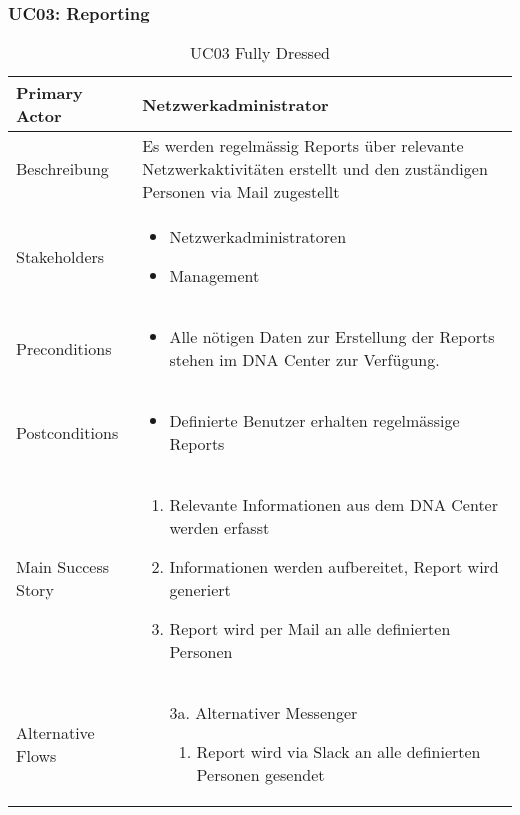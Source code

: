 \subsubsection{UC03: Reporting}
\begin{table}[H]
	\centering
	\begin{tabularx}{\textwidth}{l | X}
		Primary Actor   & Netzwerkadministrator        \\
		\hline
		Beschreibung   & Es werden regelmässig Reports über relevante Netzwerkaktivitäten erstellt und den zuständigen Personen via Mail zugestellt  \\ 
		\hline
		Stakeholders       & 
		\begin{itemize}
			\item Netzwerkadministratoren
			\item Management
		\end{itemize} \\ 
		Preconditions      &
		\begin{itemize}	
			\item Alle nötigen Daten zur Erstellung der Reports stehen im DNA Center zur Verfügung.
		\end{itemize}  \\
		\hline
		Postconditions     & 
		\begin{itemize}	
			\item Definierte Benutzer erhalten regelmässige Reports
		\end{itemize}  \\
		\hline
		Main Success Story & 
		\begin{enumerate}
			\item Relevante Informationen aus dem DNA Center werden erfasst
			\item Informationen werden aufbereitet, Report wird generiert
			\item Report wird per Mail an alle definierten Personen
		\end{enumerate}
		\\
		\hline
		Alternative Flows  & 
		\begin{itemize}
			\item[3a.] Alternativer Messenger
			\begin{enumerate}
				\item Report wird via Slack an alle definierten Personen gesendet
			\end{enumerate}
		\end{itemize}
	\end{tabularx}
	\caption{UC03 Fully Dressed}
	\label{tab:UC03}
\end{table}

